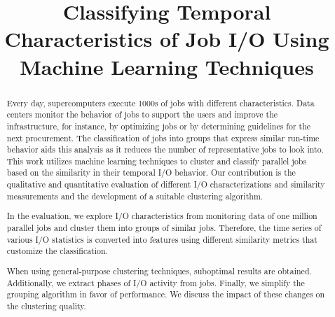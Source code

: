 \documentclass{jhps}
\begin{document}


\title{Classifying Temporal Characteristics of Job I/O Using Machine Learning Techniques}


\maketitle

\begin{abstract}
Every day, supercomputers execute 1000s of jobs with different characteristics.
Data centers monitor the behavior of jobs to support the users and improve the infrastructure, for instance, by optimizing jobs or by determining guidelines for the next procurement.
The classification of jobs into groups that express similar run-time behavior aids this analysis as it reduces the number of representative jobs to look into.
This work utilizes machine learning techniques to cluster and classify parallel jobs based on the similarity in their temporal I/O behavior.
Our contribution is the qualitative and quantitative evaluation of different I/O characterizations and similarity measurements and the development of a suitable clustering algorithm.

In the evaluation, we explore I/O characteristics from monitoring data of one million parallel jobs and cluster them into groups of similar jobs.
Therefore, the time series of various I/O statistics is converted into features using different similarity metrics that customize the classification.

When using general-purpose clustering techniques, suboptimal results are obtained.
Additionally, we extract phases of I/O activity from jobs.
Finally, we simplify the grouping algorithm in favor of performance.
We discuss the impact of these changes on the clustering quality.
\end{abstract}
\end{document}
